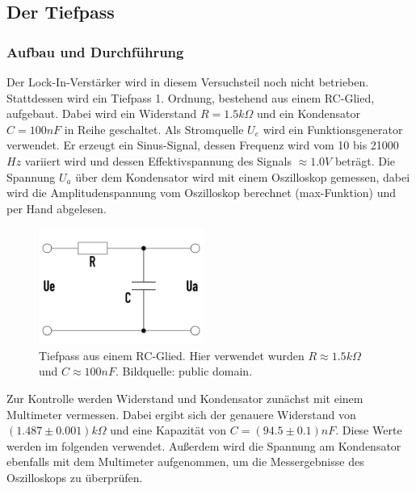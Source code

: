 \documentclass{../Misc/MontavonLaTeX/Montavon}
\newcommand{\halfwidth}{0.48\textwidth}
\begin{document}
\subsection{Der Tiefpass}
\subsubsection{Aufbau und Durchführung}
Der Lock-In-Verstärker wird in diesem Versuchsteil noch nicht betrieben. Stattdessen wird ein Tiefpass 1. Ordnung, bestehend aus einem RC-Glied, aufgebaut. Dabei wird ein Widerstand $R = 1.5 \unit{k\Omega}$ und ein Kondensator $C = 100 \unit{nF}$ in Reihe geschaltet. 
Als Stromquelle $U_e$ wird ein Funktionsgenerator verwendet. Er erzeugt ein Sinus-Signal, dessen Frequenz wird vom 10 bis 21000 $\unit{Hz}$ variiert wird und dessen Effektivspannung des Signals $\approx 1.0 \unit{V}$ beträgt. 
Die Spannung $U_a$ über dem Kondensator wird mit einem Oszilloskop gemessen, dabei wird die Amplitudenspannung vom Oszilloskop berechnet (max-Funktion) und per Hand abgelesen.

\begin{figure}[htbp]
\centering
\includegraphics[width=\halfwidth]{schaltung_tiefpass}
\caption{Tiefpass aus einem RC-Glied. Hier verwendet wurden $R \approx 1.5 \unit{k\Omega}$ und $C \approx 100 \unit{nF}$. Bildquelle: public domain.}
\end{figure}

Zur Kontrolle werden Widerstand und Kondensator zunächst mit einem Multimeter vermessen. Dabei ergibt sich der genauere Widerstand von $(1.487 \pm 0.001) \unit{k\Omega}$ und eine Kapazität von $C = (94.5 \pm 0.1) \unit{nF}$. Diese Werte werden im folgenden verwendet. Außerdem wird die Spannung am Kondensator ebenfalls mit dem Multimeter aufgenommen, um die Messergebnisse des Oszilloskops zu überprüfen.
\end{document}

